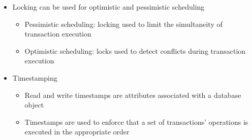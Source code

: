 \documentclass{report}
\begin{document}
\begin{itemize}
        \item Locking can be used for optimistic and pessimistic scheduling
        \begin{itemize}
            \item Pessimistic scheduling: locking used to limit the simultaneity of transaction execution
            \item Optimistic scheduling: locks used to detect conflicts during transaction execution
        \end{itemize}
        \item Timestamping
        \begin{itemize}
            \item Read and write timestamps are attributes associated with a database object
            \item Timestamps are used to enforce that a set of transactions’ operations is executed in the appropriate order
        \end{itemize}
    \end{itemize}
    
\end{document}
